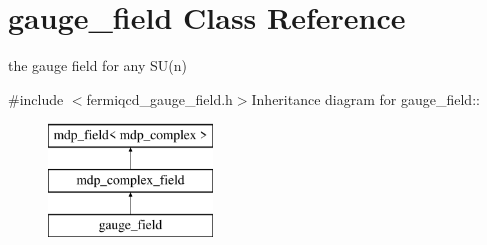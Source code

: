 \hypertarget{classgauge__field}{
\section{gauge\_\-field Class Reference}
\label{classgauge__field}
}


the gauge field for any SU(n)  


{\ttfamily \#include $<$fermiqcd\_\-gauge\_\-field.h$>$}Inheritance diagram for gauge\_\-field::\begin{figure}[H]
\begin{center}
\leavevmode
\includegraphics[height=3cm]{classgauge__field}
\end{center}
\end{figure}
